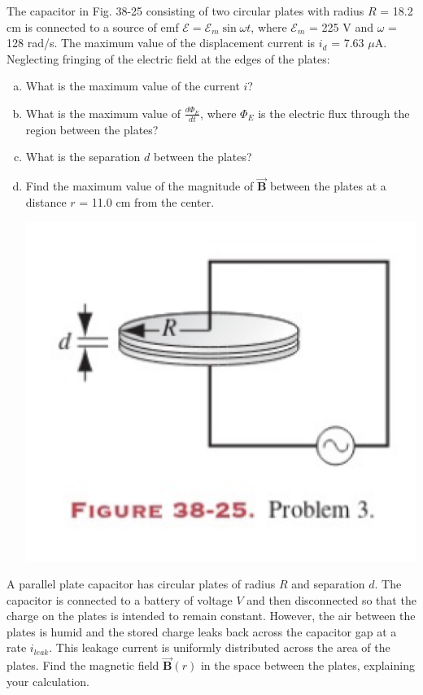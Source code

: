 \documentclass[12pt,letterpaper]{hmcpset}
\begin{document}
	\begin{problem}[38P3:]
		The capacitor in Fig. 38-25 consisting of two circular plates with radius $R$ = 18.2 cm is connected to a source of emf $\mathcal{E} = \mathcal{E}_m\sin{\omega t}$, where $\mathcal{E}_m$ = 225 V and $\omega$ = 128 rad/s.
		The maximum value of the displacement current is $i_d$ = 7.63 $\mu$A.
		Neglecting fringing of the electric field at the edges of the plates:
		\begin{enumerate}[(a)]
			\item What is the maximum value of the current $i$?
			\item What is the maximum value of $\frac{d\Phi_E}{dt}$, where $\Phi_E$ is the electric flux through the region between the plates?
			\item What is the separation $d$ between the plates?
			\item Find the maximum value of the magnitude of $\vec{\mathbf{B}}$ between the plates at a distance $r$ = 11.0 cm from the center.

			\centering\includegraphics[scale = 0.4]{Fig_38-25}
		\end{enumerate}
	\end{problem}
	\clearpage



	\begin{problem}[SUP 8.2:]
		A parallel plate capacitor has circular plates of radius $R$ and separation $d$.
		The capacitor is connected to a battery of voltage $V$ and then disconnected so that the charge on the plates is intended to remain constant.
		However, the air between the plates is humid and the stored charge leaks back across the capacitor gap at a rate $i_{leak}$.
		This leakage current is uniformly distributed across the area of the plates.
		Find the magnetic field $\vec{\mathbf{B}}(r)$ in the space between the plates, explaining your calculation.
	\end{problem}
	\clearpage
\end{document}
